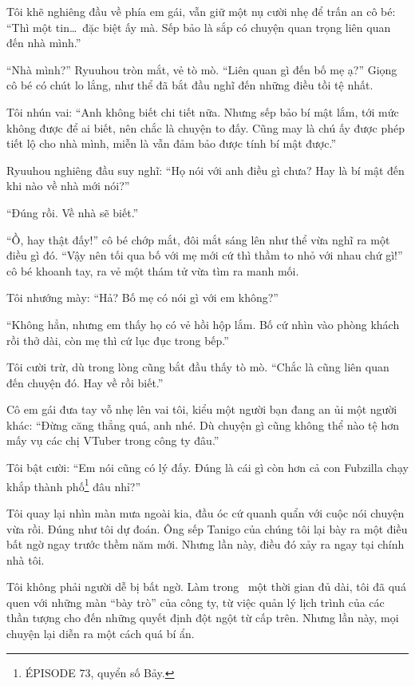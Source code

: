 \documentclass[../main.tex]{subfiles}
\begin{document}
Tôi khẽ nghiêng đầu về phía em gái, vẫn giữ một nụ cười nhẹ để trấn an cô bé: ``Thì một tin\dots\ đặc biệt ấy mà. Sếp bảo là sắp có chuyện quan trọng liên quan đến nhà mình.''

``Nhà mình?'' Ryuuhou tròn mắt, vẻ tò mò. ``Liên quan gì đến bố mẹ ạ?'' Giọng cô bé có chút lo lắng, như thể đã bắt đầu nghĩ đến những điều tồi tệ nhất.

Tôi nhún vai: ``Anh không biết chi tiết nữa. Nhưng sếp bảo bí mật lắm, tới mức không được để ai biết, nên chắc là chuyện to đấy. Cũng may là chú ấy được phép tiết lộ cho nhà mình, miễn là vẫn đảm bảo được tính bí mật được.''

Ryuuhou nghiêng đầu suy nghĩ: ``Họ nói với anh điều gì chưa? Hay là bí mật đến khi nào về nhà mới nói?''

``Đúng rồi. Về nhà sẽ biết.''

``Ồ, hay thật đấy!'' cô bé chớp mắt, đôi mắt sáng lên như thể vừa nghĩ ra một điều gì đó. ``Vậy nên tối qua bố với mẹ mới cứ thì thầm to nhỏ với nhau chứ gì!'' cô bé khoanh tay, ra vẻ một thám tử vừa tìm ra manh mối.

Tôi nhướng mày: ``Hả? Bố mẹ có nói gì với em không?''

``Không hẳn, nhưng em thấy họ có vẻ hồi hộp lắm. Bố cứ nhìn vào phòng khách rồi thở dài, còn mẹ thì cứ lục đục trong bếp.''

Tôi cười trừ, dù trong lòng cũng bắt đầu thấy tò mò. ``Chắc là cũng liên quan đến chuyện đó. Hay về rồi biết.''

Cô em gái đưa tay vỗ nhẹ lên vai tôi, kiểu một người bạn đang an ủi một người khác: ``Đừng căng thẳng quá, anh nhé. Dù chuyện gì cũng không thể nào tệ hơn mấy vụ các chị VTuber trong công ty đâu.''

Tôi bật cười: ``Em nói cũng có lý đấy. Đúng là cái gì còn hơn cả con Fubzilla chạy khắp thành phố\footnote{{\flaregothic ÉPISODE 73}, quyển số Bảy.} đâu nhỉ?''

Tôi quay lại nhìn màn mưa ngoài kia, đầu óc cứ quanh quẩn với cuộc nói chuyện vừa rồi. Đúng như tôi dự đoán. Ông sếp Tanigo của chúng tôi lại bày ra một điều bất ngờ ngay trước thềm năm mới. Nhưng lần này, điều đó xảy ra ngay tại chính nhà tôi.

Tôi không phải người dễ bị bất ngờ. Làm trong \hll\ một thời gian đủ dài, tôi đã quá quen với những màn ``bày trò'' của công ty, từ việc quản lý lịch trình của các thần tượng cho đến những quyết định đột ngột từ cấp trên. Nhưng lần này, mọi chuyện lại diễn ra một cách quá bí ẩn.
\end{document}
